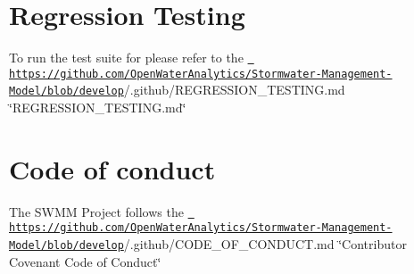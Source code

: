 \section*{Regression Testing}

To run the test suite for please refer to the \href{https://github.com/OpenWaterAnalytics/Stormwater-Management-Model/blob/develop}{\texttt{ https\+://github.\+com/\+Open\+Water\+Analytics/\+Stormwater-\/\+Management-\/\+Model/blob/develop}}/.github/\+R\+E\+G\+R\+E\+S\+S\+I\+O\+N\+\_\+\+T\+E\+S\+T\+I\+N\+G.\+md \char`\"{}\+R\+E\+G\+R\+E\+S\+S\+I\+O\+N\+\_\+\+T\+E\+S\+T\+I\+N\+G.\+md\char`\"{}

\section*{Code of conduct}

The S\+W\+MM Project follows the \href{https://github.com/OpenWaterAnalytics/Stormwater-Management-Model/blob/develop}{\texttt{ https\+://github.\+com/\+Open\+Water\+Analytics/\+Stormwater-\/\+Management-\/\+Model/blob/develop}}/.github/\+C\+O\+D\+E\+\_\+\+O\+F\+\_\+\+C\+O\+N\+D\+U\+C\+T.\+md \char`\"{}\+Contributor Covenant Code of Conduct\char`\"{} 
